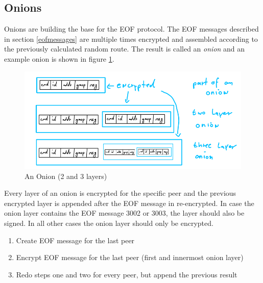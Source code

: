 \subsection{Onions}
\label{eofonion}
Onions are building the base for the EOF protocol.
The EOF messages described in section \ref{eofmessages}
are multiple times encrypted and assembled according to 
the previously calculated random route. 
The result is called an \textit{onion} and
an example onion is shown in figure \ref{onion}.
\begin{figure}
    \centering
    \caption{An Onion (2 and 3 layers)}
    \label{onion}
    \includegraphics[scale=0.8]{onion.png}
\end{figure}
Every layer of an onion is encrypted for the specific peer
and the previous encrypted layer is appended after the EOF message
in re-encrypted.
In case the onion layer contains the EOF message
3002 or 3003, the layer should also be signed. In all other
cases the onion layer should only be encrypted.
\begin{enumerate}
\item Create EOF message for the last peer
\item Encrypt EOF message for the last peer (first and innermost onion layer)
\item Redo steps one and two for every peer, but append the previous result
\end{enumerate}
